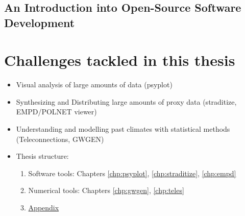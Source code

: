 \begin{refsection}
\subsection{An Introduction into Open-Source Software Development} \label{sec:intro-software-tools}


\section{Challenges tackled in this thesis} \label{sec:intro-thesis-overview}

\begin{itemize}
	\item Visual analysis of large amounts of data (psyplot)
	\item Synthesizing and Distributing large amounts of proxy data (straditize, EMPD/POLNET viewer)
	\item Understanding and modelling past climates with statistical methods (Teleconnections, GWGEN)
	\item Thesis structure:
		\begin{enumerate}
			\item Software tools: Chapters \ref{chp:psyplot}, \ref{chp:straditize}, \ref{chp:empd}
			\item Numerical tools: Chapters \ref{chp:gwgen}, \ref{chp:teles}
			\item \hyperlink{appendix}{Appendix}
		\end{enumerate}
\end{itemize}


\printbibliography[heading=subbibintoc]

\end{refsection}